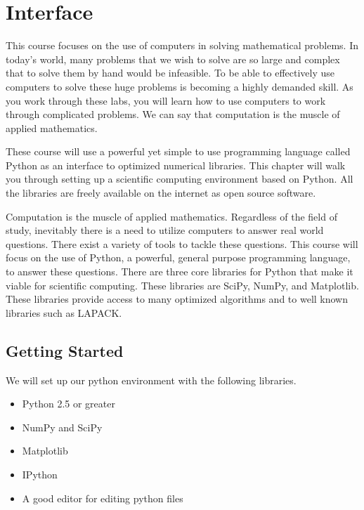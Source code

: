 \setcounter{chapter}{-1}
\chapter{Interface}


This course focuses on the use of computers in solving mathematical problems.  In today's world, many problems that we wish to solve are so large and complex that to solve them by hand would be infeasible.  To be able to effectively use computers to solve these huge problems is becoming a highly demanded skill.  As you work through these labs, you will learn how to use computers to work through complicated problems.  We can say that computation is the muscle of applied mathematics.

These course will use a powerful yet simple to use programming language called Python as an interface to optimized numerical libraries.  This chapter will walk you through setting up a scientific computing environment based on Python.  All the libraries are freely available on the internet as open source software.

Computation is the muscle of applied mathematics. Regardless of the field of study, inevitably there is a need to utilize computers to answer real world questions.  There exist a variety of tools to tackle these questions.  This course will focus on the use of Python, a powerful, general purpose programming language, to answer these questions.  There are three core libraries for Python that make it viable for scientific computing.  These libraries are SciPy, NumPy, and Matplotlib.  These libraries provide access to many optimized algorithms and to well known libraries such as LAPACK.

\section*{Getting Started}
We will set up our python environment with the following libraries.
\begin{itemize}
\item Python 2.5 or greater
\item NumPy and SciPy
\item Matplotlib
\item IPython
\item A good editor for editing python files
\end{itemize}

